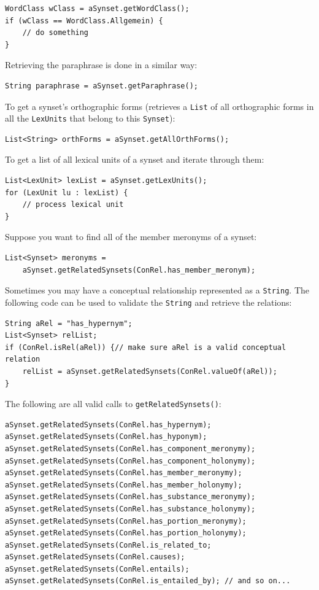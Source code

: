 \documentclass[12pt,a4paper,english,utf8]{report}
\begin{document}
\begin{lstlisting}
WordClass wClass = aSynset.getWordClass();
if (wClass == WordClass.Allgemein) {
    // do something
}
\end{lstlisting}

Retrieving the paraphrase is done in a similar way:

\begin{lstlisting}
String paraphrase = aSynset.getParaphrase();
\end{lstlisting}

To get a synset's orthographic forms (retrieves a \texttt{List} of all orthographic forms in all the \texttt{LexUnits} that belong to this \texttt{Synset}):

\begin{lstlisting}
List<String> orthForms = aSynset.getAllOrthForms();
\end{lstlisting}

To get a list of all lexical units of a synset and iterate through them:

\begin{lstlisting}
List<LexUnit> lexList = aSynset.getLexUnits();
for (LexUnit lu : lexList) {
    // process lexical unit
}
\end{lstlisting}

Suppose you want to find all of the member meronyms of a synset:

\begin{lstlisting}
List<Synset> meronyms =
    aSynset.getRelatedSynsets(ConRel.has_member_meronym);
\end{lstlisting}

Sometimes you may have a conceptual relationship represented as a \texttt{String}. The following code can be used to validate the \texttt{String} and retrieve the relations:

\begin{lstlisting}
String aRel = "has_hypernym";
List<Synset> relList;
if (ConRel.isRel(aRel)) {// make sure aRel is a valid conceptual relation
    relList = aSynset.getRelatedSynsets(ConRel.valueOf(aRel));
}
\end{lstlisting}

The following are all valid calls to \texttt{getRelatedSynsets()}:

\begin{lstlisting}
aSynset.getRelatedSynsets(ConRel.has_hypernym);
aSynset.getRelatedSynsets(ConRel.has_hyponym);
aSynset.getRelatedSynsets(ConRel.has_component_meronymy);
aSynset.getRelatedSynsets(ConRel.has_component_holonymy);
aSynset.getRelatedSynsets(ConRel.has_member_meronymy);
aSynset.getRelatedSynsets(ConRel.has_member_holonymy);
aSynset.getRelatedSynsets(ConRel.has_substance_meronymy);
aSynset.getRelatedSynsets(ConRel.has_substance_holonymy);
aSynset.getRelatedSynsets(ConRel.has_portion_meronymy);
aSynset.getRelatedSynsets(ConRel.has_portion_holonymy);
aSynset.getRelatedSynsets(ConRel.is_related_to;
aSynset.getRelatedSynsets(ConRel.causes);
aSynset.getRelatedSynsets(ConRel.entails);
aSynset.getRelatedSynsets(ConRel.is_entailed_by); // and so on...
\end{lstlisting}
\end{document}
